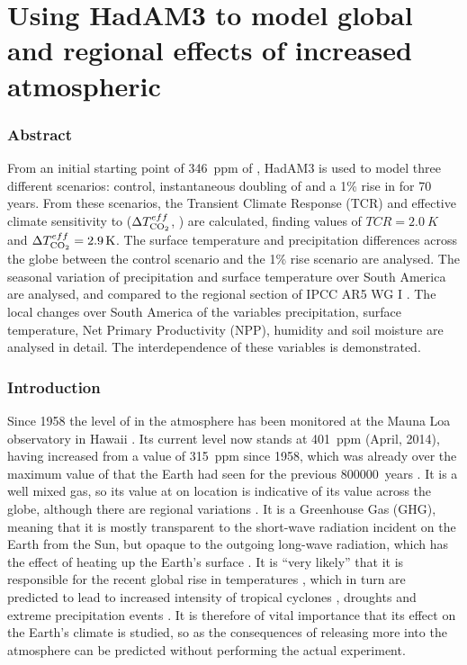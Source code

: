 \documentclass{article}
\begin{document}
\part*{Using HadAM3 to model global and regional effects of increased atmospheric }

\section*{Abstract}

From an initial starting point of \SI{346}{ppm} of , HadAM3 is used to model three different scenarios: control, instantaneous doubling of  and a 1\% rise in  for 70 years. From these scenarios, the Transient Climate Response (TCR) and effective climate sensitivity to  ($\Delta T^{eff}_{\ce{CO2}}$, ) are calculated, finding values of $TCR = \SI{2.0}{K}$ and $\Delta T^{eff}_{\ce{CO2}} = \SI{2.9}{K}$. The surface temperature and precipitation differences across the globe between the control scenario and the 1\% rise scenario are analysed. The seasonal variation of precipitation and surface temperature over South America are analysed, and compared to the regional section of IPCC AR5 WG I \parencite{ipcc2014wg1}. The local changes over South America of the variables precipitation, surface temperature, Net Primary Productivity (NPP), humidity and soil moisture are analysed in detail. The interdependence of these variables is demonstrated. %

\section{Introduction}

Since 1958 the level of  in the atmosphere has been monitored at the Mauna Loa observatory in Hawaii \parencite{keeling1976atmospheric}. Its current level now stands at \SI{401}{ppm} (April, 2014), having increased from a value of \SI{315}{ppm} since 1958, which was already over the maximum value of  that the Earth had seen for the previous \SI{800 000}{years} \parencite{yin2012individual}. It is a well mixed gas, so its value at on location is indicative of its value across the globe, although there are regional variations \parencite{gurney2002towards}. It is a Greenhouse Gas (GHG), meaning that it is mostly transparent to the short-wave radiation incident on the Earth from the Sun, but opaque to the outgoing long-wave radiation, which has the effect of heating up the Earth's surface \parencite{neelin2011climate}. It is ``very likely'' that it is responsible for the recent global rise in temperatures \parencite{ipcc2014wg1}, which in turn are predicted to lead to increased intensity of tropical cyclones \parencite{knutson2010tropical}, droughts \parencite{dai2012increasing} and extreme precipitation events \parencite{shongwe2009projected}. It is therefore of vital importance that its effect on the Earth's climate is studied, so as the consequences of releasing more  into the atmosphere can be predicted without performing the actual experiment.
\end{document}
